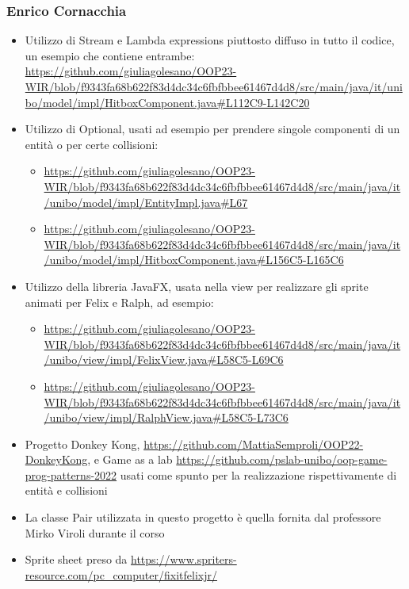 \documentclass[a4paper,12pt]{report}
\begin{document}
\subsubsection{Enrico Cornacchia}
\begin{itemize}
    \item Utilizzo di Stream e Lambda expressions piuttosto diffuso in tutto il codice, un esempio che contiene entrambe:
    \url{https://github.com/giuliagolesano/OOP23-WIR/blob/f9343fa68b622f83d4dc34c6fbfbbee61467d4d8/src/main/java/it/unibo/model/impl/HitboxComponent.java#L112C9-L142C20}
    \item Utilizzo di Optional, usati ad esempio per prendere singole componenti di un entità o per certe collisioni:
    \begin{itemize}
        \item \url{https://github.com/giuliagolesano/OOP23-WIR/blob/f9343fa68b622f83d4dc34c6fbfbbee61467d4d8/src/main/java/it/unibo/model/impl/EntityImpl.java#L67}
        \item \url{https://github.com/giuliagolesano/OOP23-WIR/blob/f9343fa68b622f83d4dc34c6fbfbbee61467d4d8/src/main/java/it/unibo/model/impl/HitboxComponent.java#L156C5-L165C6}
    \end{itemize}
    \item Utilizzo della libreria JavaFX, usata nella view per realizzare gli sprite animati per Felix e Ralph, ad esempio:
    \begin{itemize}
        \item \url{https://github.com/giuliagolesano/OOP23-WIR/blob/f9343fa68b622f83d4dc34c6fbfbbee61467d4d8/src/main/java/it/unibo/view/impl/FelixView.java#L58C5-L69C6}
        \item \url{https://github.com/giuliagolesano/OOP23-WIR/blob/f9343fa68b622f83d4dc34c6fbfbbee61467d4d8/src/main/java/it/unibo/view/impl/RalphView.java#L58C5-L73C6}
    \end{itemize}
    \item Progetto Donkey Kong, \url{https://github.com/MattiaSemproli/OOP22-DonkeyKong}, e Game as a lab \url{https://github.com/pslab-unibo/oop-game-prog-patterns-2022} usati come spunto per la realizzazione rispettivamente di entità e collisioni
    \item La classe Pair utilizzata in questo progetto è quella fornita dal professore Mirko Viroli durante il corso
    \item Sprite sheet preso da \url{https://www.spriters-resource.com/pc_computer/fixitfelixjr/}
\end{itemize}
\end{document}
